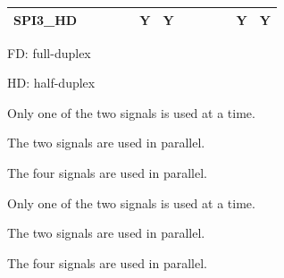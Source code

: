 \documentclass[main\_\_EN.tex]{subfiles}
\begin{document}
\begin{landscape}
\begin{table}[H]
\begin{threeparttable}
\begin{tabular}{ |p{2.0cm} |c|c|c|c|c|c|c|c|c|c|c|c| }
SPI3\_HD                   &         &         &         &         & Y\tnote{5}      & Y      &         &        &         &         & Y\tnote{8}       & Y      \\ \hline
\end{tabular}
        \begin{tablenotes}
                \item[1] FD: full-duplex
                \item[2] HD: half-duplex
                \item[3] Only one of the two signals is used at a time.
                \item[4] The two signals are used in parallel.
                \item[5] The four signals are used in parallel.
                \item[6] Only one of the two signals is used at a time.
                \item[7] The two signals are used in parallel.
                \item[8] The four signals are used in parallel.
        \end{tablenotes}
     \end{threeparttable}
    \end{table}
\end{landscape}
\end{document}
